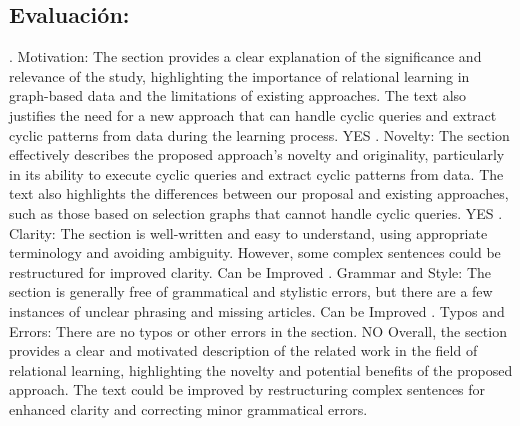 \documentclass{article}%
\begin{document}
\subsection{Evaluación:}%
\label{subsec:Evaluacin}%
. Motivation:\newline%
\newline%
The section provides a clear explanation of the significance and relevance of the study, highlighting the importance of relational learning in graph{-}based data and the limitations of existing approaches. The text also justifies the need for a new approach that can handle cyclic queries and extract cyclic patterns from data during the learning process.\newline%
\newline%
YES\newline%
. Novelty:\newline%
\newline%
The section effectively describes the proposed approach's novelty and originality, particularly in its ability to execute cyclic queries and extract cyclic patterns from data. The text also highlights the differences between our proposal and existing approaches, such as those based on selection graphs that cannot handle cyclic queries.\newline%
\newline%
YES\newline%
. Clarity:\newline%
\newline%
The section is well{-}written and easy to understand, using appropriate terminology and avoiding ambiguity. However, some complex sentences could be restructured for improved clarity.\newline%
\newline%
Can be Improved\newline%
. Grammar and Style:\newline%
\newline%
The section is generally free of grammatical and stylistic errors, but there are a few instances of unclear phrasing and missing articles.\newline%
\newline%
Can be Improved\newline%
. Typos and Errors:\newline%
\newline%
There are no typos or other errors in the section.\newline%
\newline%
NO\newline%
\newline%
Overall, the section provides a clear and motivated description of the related work in the field of relational learning, highlighting the novelty and potential benefits of the proposed approach. The text could be improved by restructuring complex sentences for enhanced clarity and correcting minor grammatical errors.
\end{document}
